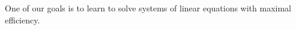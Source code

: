 One of our goals is to learn to solve systems of linear equations with maximal efficiency. 
%
%
%
%
